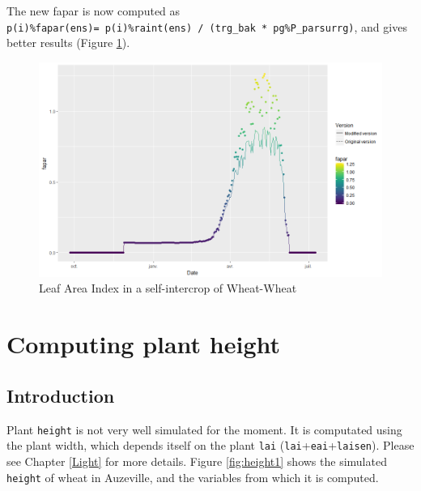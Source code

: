\documentclass[]{book}
\begin{document}
The new fapar is now computed as \texttt{p(i)\%fapar(ens)=\ p(i)\%raint(ens)\ /\ (trg\_bak\ *\ pg\%P\_parsurrg)}, and gives better results (Figure \ref{fig:FAPARcorrected}).

\begin{figure}
\centering
\includegraphics{img/FAPARcorrected.png}
\caption{\label{fig:FAPARcorrected}Leaf Area Index in a self-intercrop of Wheat-Wheat}
\end{figure}

\hypertarget{height}{%
\chapter{Computing plant height}\label{height}}

\hypertarget{introduction-7}{%
\section{Introduction}\label{introduction-7}}

Plant \texttt{height} is not very well simulated for the moment. It is computated using the plant width, which depends itself on the plant \texttt{lai} (\texttt{lai}+\texttt{eai}+\texttt{laisen}). Please see Chapter \ref{Light} for more details. Figure \ref{fig:height1} shows the simulated \texttt{height} of wheat in Auzeville, and the variables from which it is computed.
\end{document}
